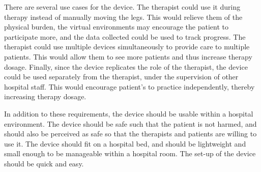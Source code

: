 \documentclass[12pt]{report}
\begin{document}

 

There are several use cases for the device. The therapist could use it during therapy instead of manually moving the legs. This would relieve them of the physical burden, the virtual environments may encourage the patient to participate more, and the data collected could be used to track progress. The therapist could use multiple devices simultaneously to provide care to multiple patients. This would allow them to see more patients and thus increase therapy dosage. Finally, since the device replicates the role of the therapist, the device could be used separately from the therapist, under the supervision of other hospital staff. This would encourage patient's to practice independently, thereby increasing therapy dosage. 

In addition to these requirements, the device should be usable within a hospital environment. The device should be safe such that the patient is not harmed, and should also be perceived as safe so that the therapists and patients are willing to use it. The device should fit on a hospital bed, and should be lightweight and small enough to be manageable within a hospital room. The set-up of the device should be quick and easy.



\end{document}
